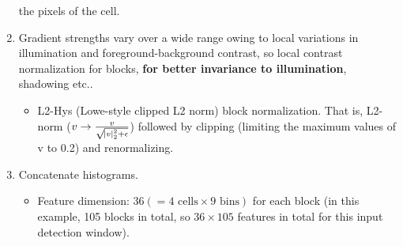 \documentclass[12pt]{article}
\numberwithin{equation}{section}
\begin{document}
\begin{enumerate}
	the pixels of the cell.
	\item Gradient strengths vary over a wide range owing to local variations in illumination and foreground-background contrast, so local contrast normalization for blocks, \textbf{for better invariance to illumination}, shadowing etc..
		\begin{itemize}
			\item L2-Hys (Lowe-style clipped L2 norm) block normalization. That is, L2-norm ($v \rightarrow \frac{v}{\sqrt{\abs{v}^2_2+\epsilon}}$) followed by 
			clipping (limiting the maximum values of v to 0.2) and renormalizing.
		\end{itemize}		
	\item Concatenate histograms.
		\begin{itemize}
			\item Feature dimension: $36(=4 \text{ cells} \times 9 \text{ bins})$ for each block (in this example, 105 blocks in total,
			so $36 \times 105$ features in total for this input detection window).
		\end{itemize}	
\end{enumerate}
\end{document}
